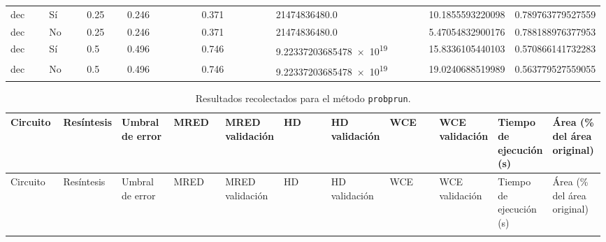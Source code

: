 {{\begin{longtable}{M{0.09\linewidth}M{0.09\linewidth}M{0.09\linewidth}M{0.09\linewidth}M{0.09\linewidth}M{0.09\linewidth}M{0.09\linewidth}M{0.09\linewidth}M{0.09\linewidth}M{0.09\linewidth}M{0.09\linewidth}}
dec & Sí & \num{0.25} & \num{0.246} &   & \num{0.371} &   & \num{21474836480.0} &   & \num{10.1855593220098} & \num{0.789763779527559} \\
dec & No & \num{0.25} & \num{0.246} &   & \num{0.371} &   & \num{21474836480.0} &   & \num{5.47054832900176} & \num{0.788188976377953} \\
dec & Sí & \num{0.5} & \num{0.496} &   & \num{0.746} &   & \num{9.22337203685478e+19} &   & \num{15.8336105440103} & \num{0.570866141732283} \\
dec & No & \num{0.5} & \num{0.496} &   & \num{0.746} &   & \num{9.22337203685478e+19} &   & \num{19.0240688519989} & \num{0.563779527559055} \\

  \end{longtable}

\clearpage

  \begin{longtable}{M{0.09\linewidth}M{0.09\linewidth}M{0.09\linewidth}M{0.09\linewidth}M{0.09\linewidth}M{0.09\linewidth}M{0.09\linewidth}M{0.09\linewidth}M{0.09\linewidth}M{0.09\linewidth}M{0.09\linewidth}}

    \caption{Resultados recolectados para el método \texttt{probprun}.}
    \label{tab:probprun_full_results}\\

    \toprule
    Circuito  & Resíntesis & Umbral de error & MRED & MRED validación & HD & HD validación & WCE & WCE validación & Tiempo de ejecución (\si{\second}) & Área (\% del área original) \\
    \midrule
    \endfirsthead

    \toprule
    Circuito  & Resíntesis & Umbral de error & MRED & MRED validación & HD & HD validación & WCE & WCE validación & Tiempo de ejecución (\si{\second}) & Área (\% del área original) \\
    \midrule
    \endhead

    \midrule
    \endfoot

    \bottomrule
    \endlastfoot


\end{longtable}}}
